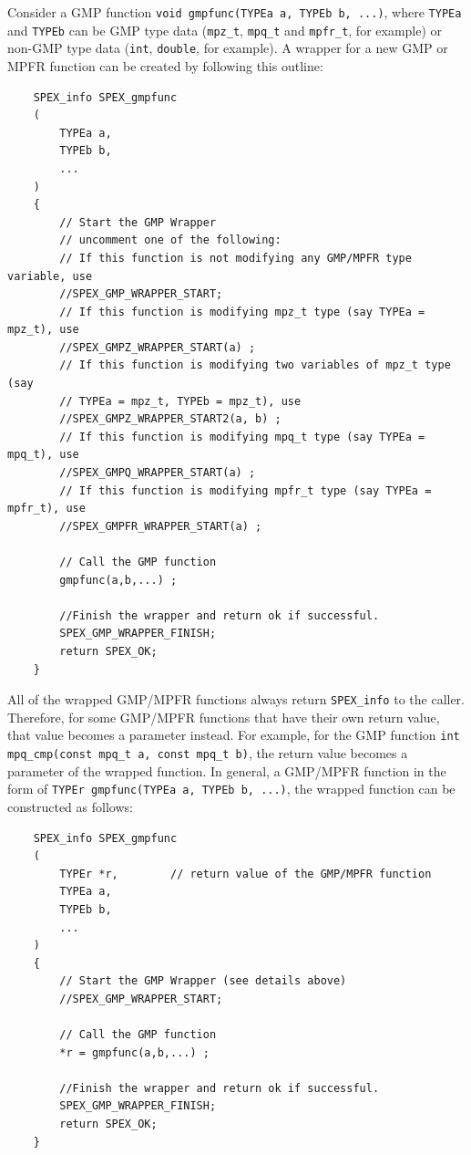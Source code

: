 \documentclass[12pt,oneside]{book}
\theoremstyle{definition}
\begin{document}
Consider a GMP function \verb|void gmpfunc(TYPEa a, TYPEb b, ...)|, where
\verb|TYPEa| and \verb|TYPEb| can be GMP type data (\verb|mpz_t|,
\verb|mpq_t| and \verb|mpfr_t|, for example) or non-GMP type data (\verb|int|,
\verb|double|, for example).
A wrapper for a new GMP or MPFR function can be created by following
this outline:

\begin{mdframed}[userdefinedwidth=\textwidth]
{\footnotesize
\begin{verbatim}
    SPEX_info SPEX_gmpfunc
    (
        TYPEa a,
        TYPEb b,
        ...
    )
    {
        // Start the GMP Wrapper
        // uncomment one of the following:
        // If this function is not modifying any GMP/MPFR type variable, use
        //SPEX_GMP_WRAPPER_START;
        // If this function is modifying mpz_t type (say TYPEa = mpz_t), use
        //SPEX_GMPZ_WRAPPER_START(a) ;
        // If this function is modifying two variables of mpz_t type (say
        // TYPEa = mpz_t, TYPEb = mpz_t), use
        //SPEX_GMPZ_WRAPPER_START2(a, b) ;
        // If this function is modifying mpq_t type (say TYPEa = mpq_t), use
        //SPEX_GMPQ_WRAPPER_START(a) ;
        // If this function is modifying mpfr_t type (say TYPEa = mpfr_t), use
        //SPEX_GMPFR_WRAPPER_START(a) ;
    
        // Call the GMP function
        gmpfunc(a,b,...) ;
    
        //Finish the wrapper and return ok if successful.
        SPEX_GMP_WRAPPER_FINISH;
        return SPEX_OK;
    }
\end{verbatim}
} \end{mdframed}

All of the wrapped GMP/MPFR
functions always return \verb|SPEX_info| to the caller. Therefore, for some
GMP/MPFR functions that have their own return value, that value becomes a parameter instead.
For example, for the GMP function \newline
\verb|int mpq_cmp(const mpq_t a, const mpq_t b)|, the return value becomes a
parameter of the wrapped function. In general, a GMP/MPFR function in the form
of \newline \verb|TYPEr gmpfunc(TYPEa a, TYPEb b, ...)|, the wrapped
function can be constructed as follows:

\newpage
\begin{mdframed}[userdefinedwidth=\textwidth]
{\footnotesize
\begin{verbatim}
    SPEX_info SPEX_gmpfunc
    (
        TYPEr *r,        // return value of the GMP/MPFR function
        TYPEa a,
        TYPEb b,
        ...
    )
    {
        // Start the GMP Wrapper (see details above)
        //SPEX_GMP_WRAPPER_START;
    
        // Call the GMP function
        *r = gmpfunc(a,b,...) ;
    
        //Finish the wrapper and return ok if successful.
        SPEX_GMP_WRAPPER_FINISH;
        return SPEX_OK;
    }
\end{verbatim}
} \end{mdframed}
\end{document}
